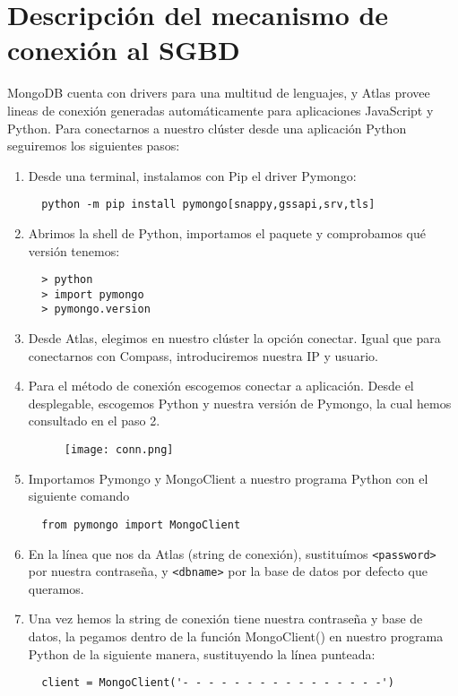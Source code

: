 \chapter{Descripción del mecanismo de conexión al SGBD}
MongoDB cuenta con drivers para una multitud de lenguajes, y Atlas provee lineas de conexión generadas automáticamente para aplicaciones JavaScript y Python. Para conectarnos a nuestro clúster desde una aplicación Python seguiremos los siguientes pasos:

\begin{enumerate}
  \item Desde una terminal, instalamos con Pip el driver Pymongo:
  \begin{lstlisting}
  python -m pip install pymongo[snappy,gssapi,srv,tls]
  \end{lstlisting}

  \item Abrimos la shell de Python, importamos el paquete y comprobamos qué versión tenemos:
  \begin{lstlisting}
  > python
  > import pymongo
  > pymongo.version
  \end{lstlisting}

  \item Desde Atlas, elegimos en nuestro clúster la opción conectar. Igual que para conectarnos con Compass, introduciremos nuestra IP y usuario.

  \item Para el método de conexión escogemos conectar a aplicación. Desde el desplegable, escogemos Python y nuestra versión de Pymongo, la cual hemos consultado en el paso 2.
    \begin{figure}[!h]
      \centering
        \texttt{[image: conn.png]}
    \end{figure}

  \item Importamos Pymongo y MongoClient a nuestro programa Python con el siguiente comando
  \begin{lstlisting}
  from pymongo import MongoClient
  \end{lstlisting}

  \item En la línea que nos da Atlas (string de conexión), sustituímos \texttt{<password>} por nuestra contraseña, y \texttt{<dbname>} por la base de datos por defecto que queramos.

  \item Una vez hemos la string de conexión tiene nuestra contraseña y base de datos, la pegamos dentro de la función MongoClient() en nuestro programa Python de la siguiente manera, sustituyendo la línea punteada:
  \begin{lstlisting}
  client = MongoClient('- - - - - - - - - - - - - - - -')
  \end{lstlisting}

\end{enumerate}
